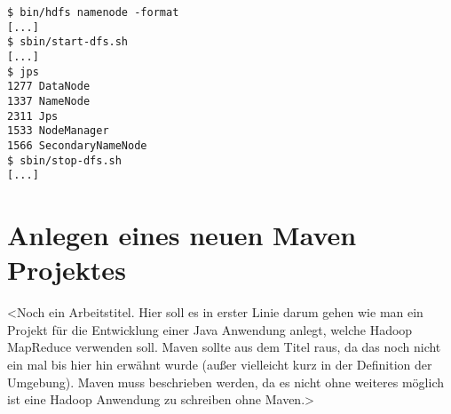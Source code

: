 \begin{lstlisting}[caption=Testen der Konfiguration, label=lis:TestenDerKonf]
$ bin/hdfs namenode -format
[...]
$ sbin/start-dfs.sh
[...]
$ jps
1277 DataNode
1337 NameNode
2311 Jps
1533 NodeManager
1566 SecondaryNameNode
$ sbin/stop-dfs.sh
[...]
\end{lstlisting}


\section{Anlegen eines neuen Maven Projektes}


<Noch ein Arbeitstitel. Hier soll es in erster Linie darum gehen wie man ein Projekt für die Entwicklung einer Java Anwendung anlegt, welche Hadoop MapReduce verwenden soll. Maven sollte aus dem Titel raus, da das noch nicht ein mal bis hier hin erwähnt wurde (außer vielleicht kurz in der Definition der Umgebung). Maven muss beschrieben werden, da es nicht ohne weiteres möglich ist eine Hadoop Anwendung zu schreiben ohne Maven.>